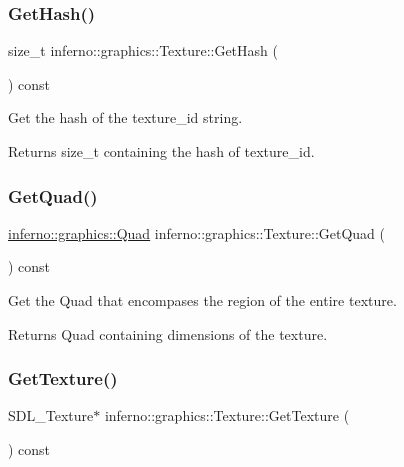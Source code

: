 \subsubsection{\texorpdfstring{Get\+Hash()}{GetHash()}}
{\footnotesize\ttfamily size\+\_\+t inferno\+::graphics\+::\+Texture\+::\+Get\+Hash (\begin{DoxyParamCaption}{ }\end{DoxyParamCaption}) const}



Get the hash of the texture\+\_\+id string. 

\begin{DoxyReturn}{Returns}
size\+\_\+t containing the hash of texture\+\_\+id. 
\end{DoxyReturn}
\mbox{\label{classinferno_1_1graphics_1_1_texture_a34c8a8546474066c66849ca2aceba0fd}} 
\subsubsection{\texorpdfstring{Get\+Quad()}{GetQuad()}}
{\footnotesize\ttfamily \mbox{\hyperlink{classinferno_1_1graphics_1_1_rectangle}{inferno\+::graphics\+::\+Quad}} inferno\+::graphics\+::\+Texture\+::\+Get\+Quad (\begin{DoxyParamCaption}{ }\end{DoxyParamCaption}) const}



Get the Quad that encompases the region of the entire texture. 

\begin{DoxyReturn}{Returns}
Quad containing dimensions of the texture. 
\end{DoxyReturn}
\mbox{\label{classinferno_1_1graphics_1_1_texture_a42df17ded08f76751332725d66a88ce2}} 
\subsubsection{\texorpdfstring{Get\+Texture()}{GetTexture()}}
{\footnotesize\ttfamily S\+D\+L\+\_\+\+Texture$\ast$ inferno\+::graphics\+::\+Texture\+::\+Get\+Texture (\begin{DoxyParamCaption}{ }\end{DoxyParamCaption}) const\hspace{0.3cm}{\ttfamily [inline]}}



